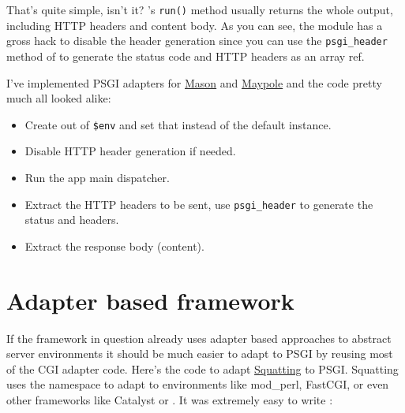 That's quite simple, isn't it? 's \lstinline!run()!
method usually returns the whole output, including HTTP headers and
content body. As you can see, the module has a gross hack to disable the
header generation since you can use the \lstinline!psgi_header! method
of  to generate the status code and HTTP headers as an array
ref.

I've implemented PSGI adapters for
\href{http://search.cpan.org/perldoc?HTML::Mason}{Mason} and
\href{http://search.cpan.org/perldoc?Maypole}{Maypole} and the code
pretty much all looked alike:

\begin{itemize}
\itemsep1pt\parskip0pt
\item
  Create  out of \lstinline!$env! and set that instead of the
  default  instance.
\item
  Disable HTTP header generation if needed.
\item
  Run the app main dispatcher.
\item
  Extract the HTTP headers to be sent, use \lstinline!psgi_header! to
  generate the status and headers.
\item
  Extract the response body (content).
\end{itemize}

\section{Adapter based framework}\label{adapter-based-framework}

If the framework in question already uses adapter based approaches to
abstract server environments it should be much easier to adapt to PSGI
by reusing most of the CGI adapter code. Here's the code to adapt
\href{http://search.cpan.org/perldoc?Squatting}{Squatting} to PSGI.
Squatting uses the  namespace to adapt to environments
like mod\_perl, FastCGI, or even other frameworks like Catalyst or
. It was extremely easy to write
\href{http://search.cpan.org/perldoc?Squatting::On::PSGI}{}:

